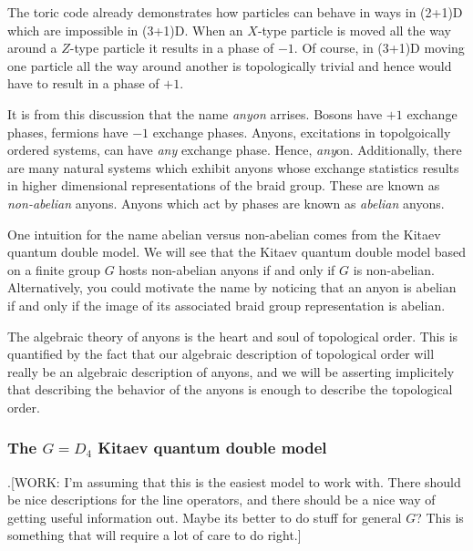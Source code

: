 \documentclass{article}
\theoremstyle{definition}
\numberwithin{figure}{section}
\begin{document}
The toric code already demonstrates how particles can behave in ways in (2+1)D which are impossible in (3+1)D. When an $X$-type particle is moved all the way around a $Z$-type particle it results in a phase of $-1$. Of course, in (3+1)D moving one particle all the way around another is topologically trivial and hence would have to result in a phase of $+1$.

It is from this discussion that the name \textit{anyon} arrises. Bosons have $+1$ exchange phases, fermions have $-1$ exchange phases. Anyons, excitations in topolgoically ordered systems, can have \textit{any} exchange phase. Hence, \textit{any}on. Additionally, there are many natural systems which exhibit anyons whose exchange statistics results in higher dimensional representations of the braid group. These are known as \textit{non-abelian} anyons. Anyons which act by phases are known as \textit{abelian} anyons.

One intuition for the name abelian versus non-abelian comes from the Kitaev quantum double model. We will see that the Kitaev quantum double model based on a finite group $G$ hosts non-abelian anyons if and only if $G$ is non-abelian. Alternatively, you could motivate the name by noticing that an anyon is abelian if and only if the image of its associated braid group representation is abelian.

The algebraic theory of anyons is the heart and soul of topological order. This is quantified by the fact that our algebraic description of topological order will really be an algebraic description of anyons, and we will be asserting implicitely that describing the behavior of the anyons is enough to describe the topological order.

\subsubsection{The $G=D_4$ Kitaev quantum double model}

.[WORK: I'm assuming that this is the easiest model to work with. There should be nice descriptions for the line operators, and there should be a nice way of getting useful information out. Maybe its better to do stuff for general $G$? This is something that will require a lot of care to do right.]
\end{document}
